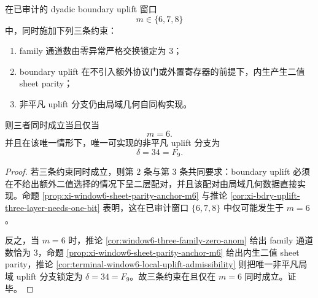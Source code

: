 \begin{corollary}[已审计窗口中三 family 通道、内生 \texorpdfstring{$\ZZ_2$}{Z2} parity 与局域 uplift 的合取仅在 \texorpdfstring{$m=6$}{m=6} 实现]\label{cor:window6-audited-triple-conjunction-only-m6}
在已审计的 dyadic boundary uplift 窗口
\[
m\in\{6,7,8\}
\]
中，同时施加下列三条约束：
\begin{enumerate}
  \item family 通道数由零异常严格交换锁定为 \(3\)；
  \item boundary uplift 在不引入额外协议门或外置寄存器的前提下，内生产生二值 sheet parity；
  \item 非平凡 uplift 分支仍由局域几何自同构实现。
\end{enumerate}
则三者同时成立当且仅当
\[
\boxed{\;m=6.\;}
\]
并且在该唯一情形下，唯一可实现的非平凡 uplift 分支为
\[
\boxed{\;\delta=34=F_9.\;}
\]
\end{corollary}

\begin{proof}
若三条约束同时成立，则第 \(2\) 条与第 \(3\) 条共同要求：boundary uplift 必须在不给出额外二值选择的情况下呈二层配对，并且该配对由局域几何数据直接实现。命题 \ref{prop:xi-window6-sheet-parity-anchor-m6} 与推论 \ref{cor:xi-bdry-uplift-three-layer-needs-one-bit} 表明，这在已审计窗口 \(\{6,7,8\}\) 中仅可能发生于 \(m=6\)。

反之，当 \(m=6\) 时，推论 \ref{cor:window6-three-family-zero-anom} 给出 family 通道数恰为 \(3\)，命题 \ref{prop:xi-window6-sheet-parity-anchor-m6} 给出内生二值 sheet parity，推论 \ref{cor:terminal-window6-local-uplift-admissibility} 则把唯一非平凡局域 uplift 分支锁定为 \(\delta=34=F_9\)。故三条约束在且仅在 \(m=6\) 同时成立。证毕。
\end{proof}
